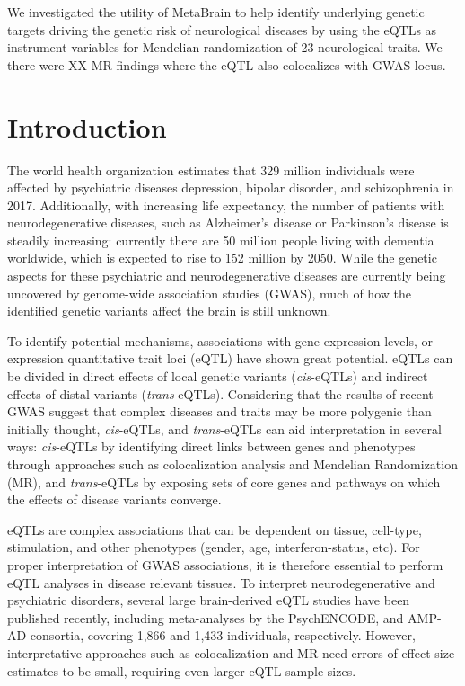 {{We investigated the utility of MetaBrain to help identify underlying genetic targets driving the genetic risk of neurological diseases by using the eQTLs as instrument variables for Mendelian randomization of 23 neurological traits. We there were XX MR findings where the eQTL also colocalizes with GWAS locus. 

\section{Introduction}
The world health organization estimates that 329 million individuals were affected by psychiatric diseases depression, bipolar disorder, and schizophrenia in 2017\cite{jamesGlobalRegionalNational2018}. Additionally, with increasing life expectancy, the number of patients with neurodegenerative diseases, such as Alzheimer’s disease or Parkinson’s disease is steadily increasing: currently there are 50 million people living with dementia worldwide, which is expected to rise to 152 million by 2050\cite{WorldAlzheimerReport2018}. While the genetic aspects for these psychiatric and neurodegenerative diseases are currently being uncovered by genome-wide association studies (GWAS), much of how the identified genetic variants affect the brain is still unknown. 

To identify potential mechanisms, associations with gene expression levels, or expression quantitative trait loci (eQTL) have shown great potential. eQTLs can be divided in direct effects of local genetic variants (\emph{cis}-eQTLs) and indirect effects of distal variants (\emph{trans}-eQTLs). Considering that the results of recent GWAS suggest that complex diseases and traits may be more polygenic than initially thought, \emph{cis}-eQTLs, and \emph{trans}-eQTLs can aid interpretation in several ways: \emph{cis}-eQTLs by identifying direct links between genes and phenotypes through approaches such as colocalization analysis and Mendelian Randomization (MR), and \emph{trans}-eQTLs by exposing sets of core genes and pathways on which the effects of disease variants converge.  

eQTLs are complex associations that can be dependent on tissue, cell-type, stimulation, and other phenotypes (gender, age, interferon-status, etc). For proper interpretation of GWAS associations, it is therefore essential to perform eQTL analyses in disease relevant tissues. To interpret neurodegenerative and psychiatric disorders, several large brain-derived eQTL studies have been published recently, including meta-analyses by the PsychENCODE\cite{wangComprehensiveFunctionalGenomic2018}, and AMP-AD\cite{rajIntegrativeTranscriptomeAnalyses2018} consortia, covering 1,866 and 1,433 individuals, respectively. However, interpretative approaches such as colocalization and MR need errors of effect size estimates to be small, requiring even larger eQTL sample sizes. 

}}
